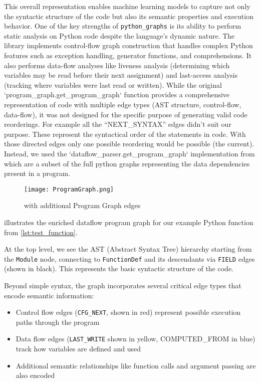 \documentclass[%
thesis=student,%
coverpage=false,%
titlepage=false,%
headmarks=true, %
english,%
font=libertine, %
math=newpxtx, %
BCOR=5mm,%
coverBCOR=11mm%
]{tum-templates/book/tumbook}
\begin{document}
This overall representation enables machine learning models to capture not only the syntactic structure of the code but also its semantic properties and execution behavior.
One of the key strengths of \texttt{python\_graphs} is its ability to perform static analysis on Python code despite the language's dynamic nature. The library implements control-flow graph construction that handles complex Python features such as exception handling, generator functions, and comprehensions. It also performs data-flow analyses like liveness analysis (determining which variables may be read before their next assignment) and last-access analysis (tracking where variables were last read or written). 
While the original `program\_graph.get\_program\_graph` function provides a comprehensive representation of code with multiple edge types (AST structure, control-flow, data-flow), it was not designed for the specific purpose of generating valid code reorderings. For example all the “NEXT\_\allowbreak SYNTAX” edges didn't suit our purpose. These represent the syntactical order of the statements in code. With those directed edges only one possible reordering would be possible (the current).\\
Instead, we used the `dataflow\_parser.get\_program\_graph` implementation from \textcite{Geisler2023} which are a subset of the full python graphs representing the data dependencies present in a program. 

\begin{figure}[htbp]
    \centering
    \texttt{[image: ProgramGraph.png]}
    \caption{ with additional Program Graph edges}
    \label{fig:ProgramGraph}
\end{figure}

 illustrates the enriched dataflow program graph for our example Python function from \ref{lst:test_function}.

At the top level, we see the AST (Abstract Syntax Tree) hierarchy starting from the \texttt{Module} node, connecting to \texttt{FunctionDef} and its descendants via \texttt{FIELD} edges (shown in black). This represents the basic syntactic structure of the code.

Beyond simple syntax, the graph incorporates several critical edge types that encode semantic information:
\begin{itemize}
    \item Control flow edges (\texttt{CFG\_NEXT}, shown in red) represent possible execution paths through the program
    \item Data flow edges (\texttt{LAST\_WRITE} shown in yellow, COMPUTED\_FROM in blue) track how variables are defined and used
    \item Additional semantic relationships like function calls and argument passing are also encoded
\end{itemize}
\end{document}
